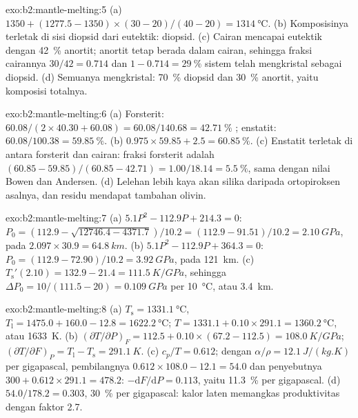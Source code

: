 \begin{solution}{exo:b2:mantle-melting:5}
(a) $1350 + (1277.5 - 1350)\times(30 - 20)/(40 - 20) = \qty{1314}{\celsius}$.
(b) Komposisinya terletak di sisi diopsid dari eutektik: diopsid.
(c) Cairan mencapai eutektik dengan \qty{42}{\percent} anortit; anortit
tetap berada dalam cairan, sehingga fraksi cairannya $30/42 = 0.714$ dan $1 - 0.714 =
\qty{29}{\percent}$ sistem telah mengkristal sebagai diopsid. (d) Semuanya
mengkristal: \qty{70}{\percent} diopsid dan \qty{30}{\percent} anortit, yaitu
komposisi totalnya.
\end{solution}

\begin{solution}{exo:b2:mantle-melting:6}
(a) Forsterit: $60.08/(2\times40.30 + 60.08) = 60.08/140.68 =
\qty{42.71}{\percent}$ ; enstatit: $60.08/100.38 = \qty{59.85}{\percent}$.
(b) $0.975\times59.85 + 2.5 = \qty{60.85}{\percent}$. (c) Enstatit terletak di antara
forsterit dan cairan: fraksi forsterit adalah $(60.85 - 59.85)/(60.85 -
42.71) = 1.00/18.14 = \qty{5.5}{\percent}$, sama dengan nilai Bowen dan Andersen. (d) Lelehan
lebih kaya akan silika daripada ortopiroksen asalnya, dan residu
mendapat tambahan olivin.
\end{solution}

\begin{solution}{exo:b2:mantle-melting:7}
(a) $5.1P^2 - 112.9P + 214.3 = 0$: $P_0 = (112.9 - \sqrt{12746.4 -
4371.7})/10.2 = (112.9 - 91.51)/10.2 = \qty{2.10}{GPa}$, pada $2.097\times30.9 =
\qty{64.8}{km}$. (b) $5.1P^2 - 112.9P + 364.3 = 0$: $P_0 = (112.9 -
72.90)/10.2 = \qty{3.92}{GPa}$, pada \qty{121}{km}. (c) $T_{\mathrm s}'(2.10) = 132.9
- 21.4 = \qty{111.5}{K/GPa}$, sehingga $\Delta P_0 = 10/(111.5 - 20) = \qty{0.109}{GPa}$
per \qty{10}{\celsius}, atau \qty{3.4}{km}.
\end{solution}

\begin{solution}{exo:b2:mantle-melting:8}
(a) $T_{\mathrm s} = \qty{1331.1}{\celsius}$, $T_{\mathrm l} = 1475.0 + 160.0 -
12.8 = \qty{1622.2}{\celsius}$; $T = 1331.1 + 0.10\times291.1 =
\qty{1360.2}{\celsius}$, atau \qty{1633}{K}. (b) $(\partial T/\partial P)_F = 112.5
+ 0.10\times(67.2 - 112.5) = \qty{108.0}{K/GPa}$; $(\partial T/\partial F)_P =
T_{\mathrm l} - T_{\mathrm s} = \qty{291.1}{K}$. (c) $c_p/T = 0.612$; dengan $\alpha/\rho
= \qty{12.1}{J/(kg.K)}$ per gigapascal, pembilangnya $0.612\times108.0 - 12.1
= 54.0$ dan penyebutnya $300 + 0.612\times291.1 = 478.2$: $-\mathrm dF/\mathrm
dP = 0.113$, yaitu \qty{11.3}{\percent} per gigapascal. (d) $54.0/178.2 = 0.303$,
\qty{30}{\percent} per gigapascal: kalor laten memangkas produktivitas dengan
faktor 2.7.
\end{solution}

